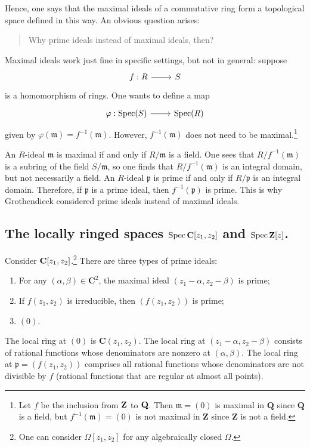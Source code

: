\documentclass [11 pt, oneside] {article}
\begin{document}
Hence, one says that the maximal ideals of a commutative ring form a topological space defined in this way. An obvious question arises:
\begin{quote}
	\small 
	Why prime ideals instead of maximal ideals, then?
\end{quote}
Maximal ideals work just fine in specific settings, but not in general: suppose 
\[
\begin{tikzcd}
f:R\ar[r]&S
\end{tikzcd}
\]
is a homomorphism of rings. One wants to define a map 
\[
\begin{tikzcd}
\varphi:\Spec (S) \ar[r]& \Spec (R)
\end{tikzcd}
\]
given by $\varphi(\mathfrak{m})= f^{-1}(\mathfrak{m})$. However, $f^{-1}(\mathfrak{m})$ does not need to be maximal.\footnote{Let $f$ be the inclusion from $\mathbf Z$ to $\mathbf Q$. Then $\mathfrak{m}=(0)$ is maximal in $\mathbf{Q}$ since $\mathbf{Q}$ is a field, but $f^{-1}(\mathfrak{m}) = (0)$ is not maximal in $\mathbf{Z}$ since $\mathbf{Z}$ is not a field.}

An $R$-ideal $\mathfrak{m}$ is maximal if and only if $R/\mathfrak{m}$ is a field. One sees that $R/f^{-1}(\mathfrak{m})$ is a subring of the field $S/\mathfrak{m}$, so one finds that $R/f^{-1}(\mathfrak{m})$ is an integral domain, but not necessarily a field. An $R$-ideal $\mathfrak{p}$ is prime if and only if $R/\mathfrak{p}$ is an integral domain. Therefore, if $\mathfrak{p}$ is a prime ideal, then $f^{-1}(\mathfrak{p})$ is prime. This is why Grothendieck considered prime ideals instead of maximal ideals.

\subsection{The locally ringed spaces \texorpdfstring{$\operatorname{Spec} \mathbf C[z_1,z_2]$}{Spec C[z1,z2]} and \texorpdfstring{$\operatorname{Spec} \mathbf Z[z]$}{Spec Z[z]}.}
Consider $\mathbf C[z_1,z_2]$.\footnote{One can consider $\Omega[z_1,z_2]$ for any algebraically closed $\Omega$.} There are three types of prime ideals:
\begin{enumerate}
	\item For any $(\alpha,\beta)\in  \mathbf{C}^2$, the maximal ideal $(z_1-\alpha,z_2-\beta)$ is prime;
	\item If $f(z_1,z_2)$ is irreducible, then $(f(z_1,z_2))$ is prime; 
	\item $(0)$.
\end{enumerate}
The local ring at $(0)$ is $\mathbf{C}(z_1,z_2)$. The local ring at $(z_1-\alpha, z_2-\beta)$ consists of rational functions whose denominators are nonzero at $(\alpha,\beta)$. The local ring at $\mathfrak{p} = (f(z_1,z_2))$ comprises all rational functions whose denominators are not divisible by $f$ (rational functions that are regular at almost all points).
\end{document}
